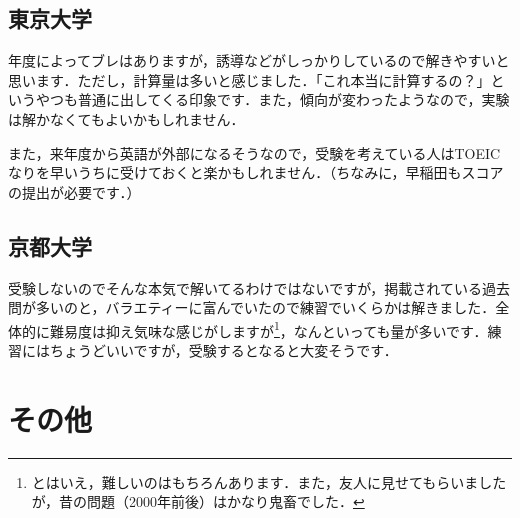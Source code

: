 \documentclass[a4paper,pdflatex,ja=standard]{bxjsarticle}
\begin{document}
\subsection{東京大学}

年度によってブレはありますが，誘導などがしっかりしているので解きやすいと思います．ただし，計算量は多いと感じました．「これ本当に計算するの？」というやつも普通に出してくる印象です．また，傾向が変わったようなので，実験は解かなくてもよいかもしれません．

また，来年度から英語が外部になるそうなので，受験を考えている人はTOEICなりを早いうちに受けておくと楽かもしれません．（ちなみに，早稲田もスコアの提出が必要です．）

\subsection{京都大学}

受験しないのでそんな本気で解いてるわけではないですが，掲載されている過去問が多いのと，バラエティーに富んでいたので練習でいくらかは解きました．全体的に難易度は抑え気味な感じがしますが\footnote{
  とはいえ，難しいのはもちろんあります．また，友人に見せてもらいましたが，昔の問題（2000年前後）はかなり鬼畜でした．
}，なんといっても量が多いです．練習にはちょうどいいですが，受験するとなると大変そうです．

\section{その他}
\end{document}
